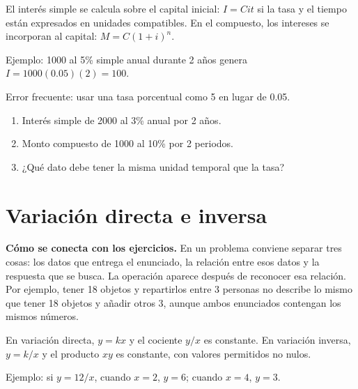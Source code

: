 \documentclass[10pt,oneside,openany]{book}
\begin{document}
El interés simple se calcula sobre el capital inicial: $I=Cit$ si la tasa y el tiempo están expresados en unidades compatibles. En el compuesto, los intereses se incorporan al capital: $M=C(1+i)^n$.

\begin{ejemplo}
Ejemplo: \textdollar{}1000 al 5\% simple anual durante 2 años genera $I=1000(0.05)(2)=100$.
\end{ejemplo}

\begin{ojo}
Error frecuente: usar una tasa porcentual como 5 en lugar de 0.05.
\end{ojo}

\begin{practica}

\begin{enumerate}

\item Interés simple de \textdollar{}2000 al 3\% anual por 2 años.

\item Monto compuesto de \textdollar{}1000 al 10\% por 2 periodos.

\item ¿Qué dato debe tener la misma unidad temporal que la tasa?

\end{enumerate}

\end{practica}



\section{Variación directa e inversa}

\textbf{Cómo se conecta con los ejercicios.} En un problema conviene separar tres cosas: los datos que entrega el enunciado, la relación entre esos datos y la respuesta que se busca. La operación aparece después de reconocer esa relación. Por ejemplo, tener 18 objetos y repartirlos entre 3 personas no describe lo mismo que tener 18 objetos y añadir otros 3, aunque ambos enunciados contengan los mismos números.

En variación directa, $y=kx$ y el cociente $y/x$ es constante. En variación inversa, $y=k/x$ y el producto $xy$ es constante, con valores permitidos no nulos.

\begin{ejemplo}
Ejemplo: si $y=12/x$, cuando $x=2$, $y=6$; cuando $x=4$, $y=3$.
\end{ejemplo}
\end{document}
